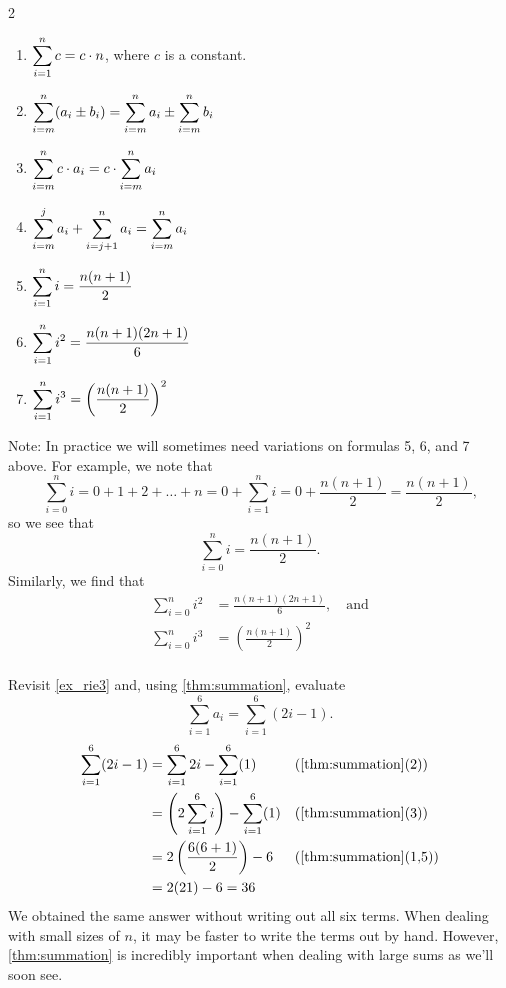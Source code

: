 {
\begin{theorem}\label{thm:summation}%
\mbox{}\\[-\baselineskip]\parbox[t]{\linewidth}{%
\begin{multicols}{2}
\begin{enumerate}
	\item	$\displaystyle \sum_{i=1}^n c = c\cdot n$, where $c$ is a constant.
	\item	$\displaystyle \sum_{i=m}^n (a_i\pm b_i) = \sum_{i=m}^n a_i \pm \sum_{i=m}^n b_i$
	\item	$\displaystyle \sum_{i=m}^n c\cdot a_i = c\cdot\sum_{i=m}^n a_i$
	\item	$\displaystyle \sum_{i=m}^j a_i + \sum_{i=j+1}^n  a_i = \sum_{i=m}^n a_i$
	\item	$\displaystyle \sum_{i=1}^n i = \frac{n(n+1)}2$
	\item	$\displaystyle \sum_{i=1}^n i^2 = \frac{n(n+1)(2n+1)}6$
	\item	$\displaystyle \sum_{i=1}^n i^3 = \left(\frac{n(n+1)}2\right)^2$
	\end{enumerate}
\end{multicols}}
\end{theorem}
}

Note: In practice we will sometimes need variations on formulas 5, 6, and 7 above. For example, we note that
\[
\sum_{i=0}^n i=0+1+2+\dots+n
=0+\sum_{i=1}^n i=0+\frac{n(n+1)}{2}
=\frac{n(n+1)}{2}\text{,}
\]
so we see that \[\sum_{i=0}^n i=\frac{n(n+1)}{2}.\] Similarly, we find that 
\begin{align*}
\sum_{i=0}^n i^2&=\frac{n(n+1)(2n+1)}{6},\quad\text{and}\\
\sum_{i=0}^n i^3&=\left(\frac{n(n+1)}{2}\right)^2\\
\end{align*}

\begin{example}\label{ex_rie4}%
Revisit \autoref{ex_rie3} and, using \autoref{thm:summation}, evaluate \[\sum_{i=1}^6 a_i = \sum_{i=1}^6 (2i-1).\]
\solution
\begin{align*}
\sum_{i=1}^6 (2i-1)
&=\sum_{i=1}^6 2i-\sum_{i=1}^6 (1) && \text{(\autoref{thm:summation}(2))}\\
&=\left( 2\sum_{i=1}^6 i\right) -\sum_{i=1}^6 (1)
&& \text{(\autoref{thm:summation}(3))}\\
&=2\left(\frac{6(6+1)}{2}\right)-6 && \text{(\autoref{thm:summation}(1,5))}\\
&=2(21)-6=36
\end{align*}
We obtained the same answer without writing out all six terms. When dealing with small sizes of $n$, it may be faster to write the terms out by hand. However, \autoref{thm:summation} is incredibly important when dealing with large sums as we'll soon see.
\end{example}
 

